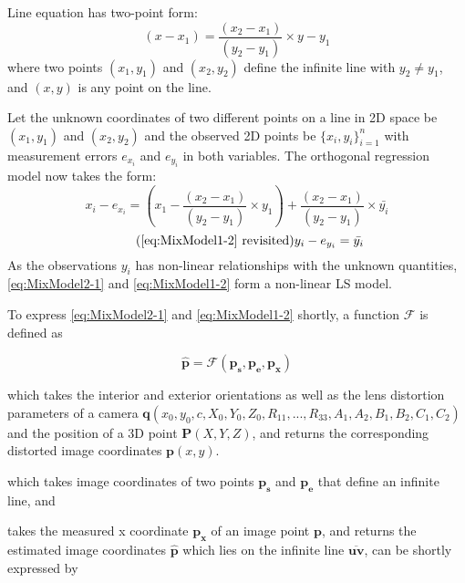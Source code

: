 Line equation has two-point form:
\begin{equation} \label{eq:LineInTwoPointForm}
(x-x_1) = \dfrac{(x_2-x_1)}{(y_2-y_1)}\times y-y_1
\end{equation}
where two points $(x_1,y_1)$ and $(x_2,y_2)$ define the infinite line with $y_2\neq y_1$, and $(x,y)$ is any point on the line.

Let the unknown coordinates of two different points on a line in 2D space be $(x_1,y_1)$ and $(x_2,y_2)$ and the observed 2D points be $\{x_i,y_i\}^n_{i=1}$ with measurement errors $e_{x_i}$ and $e_{y_i}$ in both variables. The orthogonal regression model now takes the form: 
\begin{equation} \label{eq:MixModel2-1}
x_i - e_{x_i}= (x_1-\dfrac{(x_2-x_1)}{(y_2-y_1)}\times y_1) + \dfrac{(x_2-x_1)}{(y_2-y_1)}\times \bar{y_i}
\end{equation}
\begin{equation} \tag{\ref{eq:MixModel1-2} revisited}
y_i-e_{y_i} = \bar{y_i}
\end{equation}
As the observations $y_i$ has non-linear relationships with the unknown quantities, \cref{eq:MixModel2-1} and \cref{eq:MixModel1-2} form a non-linear LS model.



To express \eqref{eq:MixModel2-1} and \eqref{eq:MixModel1-2} shortly, a function $\mathcal{F}$ is defined as

\begin{equation} \label{eq:Ffunction}
\mathbf{\hat{p}} = \mathcal{F}(\mathbf{p_s},\mathbf{p_e},\mathbf{p_x})
\end{equation}

which takes the interior and exterior orientations as well as the lens distortion parameters of a camera $\mathbf{q}(x_0,y_0,c,X_0,Y_0,Z_0,R_{11},...,R_{33},A_1,A_2,B_1,B_2,C_1,C_2)$ and the position of a 3D point $\mathbf{P}(X, Y, Z)$, and returns the corresponding distorted image coordinates $\mathbf{p}(x,y)$.


which takes image coordinates of two points $\mathbf{p_s}$ and $\mathbf{p_e}$ that define an infinite line, and 

takes the measured x coordinate $\mathbf{p_x}$ of an image point $\mathbf{p}$, and returns the estimated image coordinates $\mathbf{\hat{p}}$ which lies on the infinite line $\overline{\mathbf{u}\mathbf{v}}$, can be shortly expressed by

